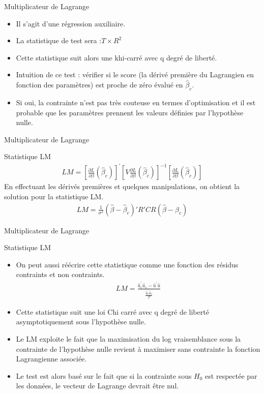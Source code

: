 \documentclass{beamer}
\begin{document}
\begin{frame}{Multiplicateur de Lagrange}
\begin{itemize}
\item Il s’agit d’une régression auxiliaire.
\item La statistique de test sera :$T \times R^2$
\item Cette statistique suit alors une khi-carré avec q degré de liberté. 
\item Intuition de ce test : vérifier si le score (la dérivé première du Lagrangien en fonction des paramètres) est proche de zéro évalué en $\hat{\beta}_c$.
\item Si oui, la contrainte n’est pas très couteuse en termes d’optimisation et il est probable que les paramètres prennent les valeurs définies par l’hypothèse nulle.
\end{itemize}
\end{frame}

\begin{frame}{Multiplicateur de Lagrange}
\begin{block}{Statistique LM}
\begin{align*}
LM= \left[ \frac{\partial L}{\partial \beta} (\hat{\beta}_c)\right]^{'}\left[V \frac{\partial L}{\partial \beta} (\hat{\beta}_c)\right]^{-1}\left[ \frac{\partial L}{\partial \beta} (\hat{\beta}_c)\right]
\end{align*}
En effectuant les dérivés premières et quelques manipulations, on obtient la solution pour la statistique LM.
\begin{align*}
LM=\frac{1}{\sigma^2} (\hat{\beta}-\hat{\beta}_c)'R'CR(\hat{\beta}-\hat{\beta}_c)
\end{align*}

\end{block}
\end{frame}

\begin{frame}{Multiplicateur de Lagrange}
\begin{block}{Statistique LM}
\begin{itemize}
\item On peut aussi réécrire cette statistique comme une fonction des résidus contraints et non contraints.
\begin{align*}
LM = \frac{\hat{u}_c^{'}\hat{u}_c-\hat{u}^{'}\hat{u}}{\frac{\hat{u}_c^{'}\hat{u}_c}{T}}
\end{align*}
\item Cette statistique suit une loi Chi carré avec q degré de liberté asymptotiquement sous l’hypothèse nulle.
\item Le LM exploite le fait que la maximisation du log vraisemblance sous la contrainte de l’hypothèse nulle revient à maximiser sans contrainte la fonction Lagrangienne associée. 
\item  Le test est alors basé sur le fait que si la contrainte sous $H_0$ est respectée par les données, le vecteur de Lagrange devrait être nul.

\end{itemize}
\end{block}
\end{frame}
\end{document}
